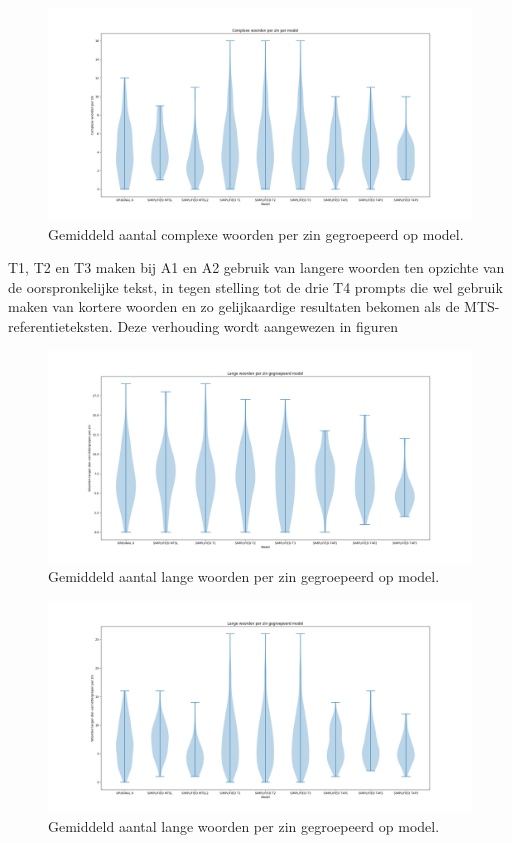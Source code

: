 \begin{figure}
	\includegraphics[width=\linewidth]{img/violinplot-complex-a2.png}
	\caption{Gemiddeld aantal complexe woorden per zin gegroepeerd op model.}
	\label{img:violinplot-complex-a2}
\end{figure}

T1, T2 en T3 maken bij A1 en A2 gebruik van langere woorden ten opzichte van de oorspronkelijke tekst, in tegen stelling tot de drie T4 prompts die wel gebruik maken van kortere woorden en zo gelijkaardige resultaten bekomen als de MTS-referentieteksten. Deze verhouding wordt aangewezen in figuren 

\begin{figure}
	\includegraphics[width=\linewidth]{img/violinplot-long-a1.png}
	\caption{Gemiddeld aantal lange woorden per zin gegroepeerd op model.}
	\label{img:violinplot-long-a1}
\end{figure}

\begin{figure}
	\includegraphics[width=\linewidth]{img/violinplot-long-a2.png}
	\caption{Gemiddeld aantal lange woorden per zin gegroepeerd op model.}
	\label{img:violinplot-long-a2}
\end{figure}


